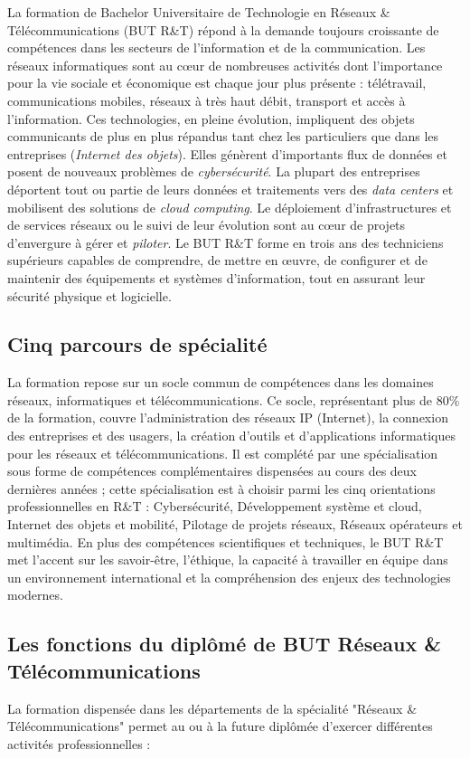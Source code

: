 La formation de Bachelor Universitaire de Technologie en Réseaux \& Télécommunications  (BUT R\&T) répond à la demande toujours croissante de compétences dans les secteurs  de l'information et de la communication. Les réseaux informatiques sont au cœur de nombreuses activités dont l'importance pour la vie sociale et économique est chaque jour plus présente : télétravail, communications mobiles, réseaux à très haut débit, transport et accès à l'information. Ces technologies, en pleine évolution, impliquent des objets communicants  de plus en plus répandus tant chez les particuliers que dans les entreprises ({\em Internet des objets}). Elles génèrent d'importants flux de données et posent de nouveaux problèmes de {\em cybersécurité}. La plupart des entreprises déportent tout ou partie de leurs données et traitements vers des {\em data centers} et mobilisent des solutions de {\em cloud computing}. Le déploiement d'infrastructures et de services réseaux ou le suivi de leur évolution sont au cœur de projets d'envergure à gérer et {\em piloter}.  Le BUT R\&T forme en trois ans des techniciens supérieurs capables de comprendre, de mettre en œuvre, de  configurer et de maintenir des équipements et systèmes d'information, tout en assurant leur sécurité physique et logicielle. 

\subsection*{Cinq parcours de spécialité}
La formation repose sur un socle commun de compétences dans les domaines réseaux, informatiques et télécommunications. Ce socle, représentant plus de 80\% de la formation, couvre l'administration des réseaux IP (Internet), la connexion des entreprises et des usagers, la création d'outils et d'applications informatiques pour les réseaux et télécommunications. Il est complété par une spécialisation sous forme de compétences complémentaires dispensées au cours des deux dernières années ; cette spécialisation est à choisir parmi les cinq orientations professionnelles en R\&T : Cybersécurité, Développement système et cloud, Internet des objets et mobilité, Pilotage de projets réseaux, Réseaux opérateurs et multimédia. En plus des compétences scientifiques et techniques, le BUT R\&T met l'accent sur les savoir-être, l'éthique, la capacité à travailler en équipe dans un environnement international et la compréhension des enjeux des technologies modernes.

\subsection*{Les fonctions du diplômé de BUT Réseaux \& Télécommunications}
La formation dispensée dans les départements de la spécialité "Réseaux \& Télécommunications" permet au ou à la future diplômée d'exercer différentes activités professionnelles :

